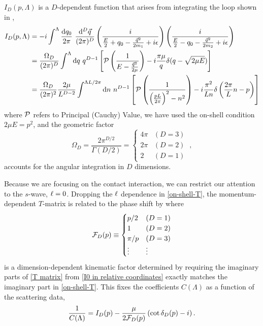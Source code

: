 $I_D(p,\Lambda)$ is a $D$-dependent function that arises from integrating the loop shown in ,
\begin{align}
    I_D(p, \Lambda)
    &=-i\int^{\Lambda}
        \frac { \mathrm {d}q_0}{2\pi}\ \frac{\mathrm { d } ^ { D } \vec{ q } } { (2\pi)^ { D } }
        \left( \frac { i } { \frac{E}{2} + q _ { 0 } - \frac{\vec{q}^2}{2m_1} + i \epsilon } \right)
        \left( \frac { i } { \frac{E}{2} - q _ { 0 } - \frac{\vec{q}^2}{2m_2} + i \epsilon } \right)
    \label{eq:I0 in two particle language}\\
    &=\frac{\Omega_D}{(2\pi)^D}\int^{\Lambda}  \mathrm { d } q \ q^{D-1}\left[\PV \left( \frac { 1 } { E - \frac{\vec{q}^2}{2\mu} } \right)
-i\frac{\pi \mu}{q}\delta(q-\sqrt{2 \mu E})\right]
    \label{eq:I0 in relative coordinates}
    \\
    &=\frac{\Omega_D}{(2\pi)^2}\frac{2\mu}{L^{D-2}}\int^{\Lambda L/2\pi}  \mathrm { d } n \ n^{D-1}\left[\PV \left( \frac { 1 } { \left(\frac{pL}{2\pi}\right)^2 - n^2 } \right)
-i\frac{\pi^2}{L n}\delta\left(\frac{2\pi}{L}n -p\right)\right]
    \label{eq:I0}
\end{align}
where $\mathcal{P}$ refers to Principal (Cauchy) Value, we have used the on-shell condition $2\mu E=p^2$, and the geometric factor
\begin{equation}
\Omega_D=\frac{2\pi^{D/2}}{\Gamma(D/2)}=
    \begin{cases}
        4\pi    &   (D=3)\\
        2\pi    &   (D=2)\\
        2       &   (D=1)
    \end{cases}\ ,
\end{equation}
accounts for the angular integration in $D$ dimensions.

Because we are focusing on the contact interaction, we can restrict our attention to the $s$-wave, $\ell=0$.
Dropping the $\ell$ dependence in \eqref{on-shell-T}, the momentum-dependent $T$-matrix is related to the phase shift by where
\begin{equation}\label{eq:spherical FD}
    \mathcal{F}_{D}(p)
    \equiv
    \begin{cases}
        p/2     & (D=1)\\
        1       & (D=2)\\
        \pi/p   & (D=3)\\
        \vdots  & \vdots
\end{cases}
\end{equation}
is a dimension-dependent kinematic factor determined by requiring the imaginary parts of \eqref{T matrix} from \eqref{I0 in relative coordinates} exactly matches the imaginary part in \eqref{on-shell-T}.
This fixes the coefficients $C(\Lambda)$ as a function of the scattering data,
\begin{equation}\label{eq:IV pole}
    \frac{1}{C(\Lambda)}
    =
    I_D(p) - \frac{\mu}{2 \mathcal{F}_{D}(p)}\left(\cot \delta_{D}(p) - i\right).
\end{equation}

